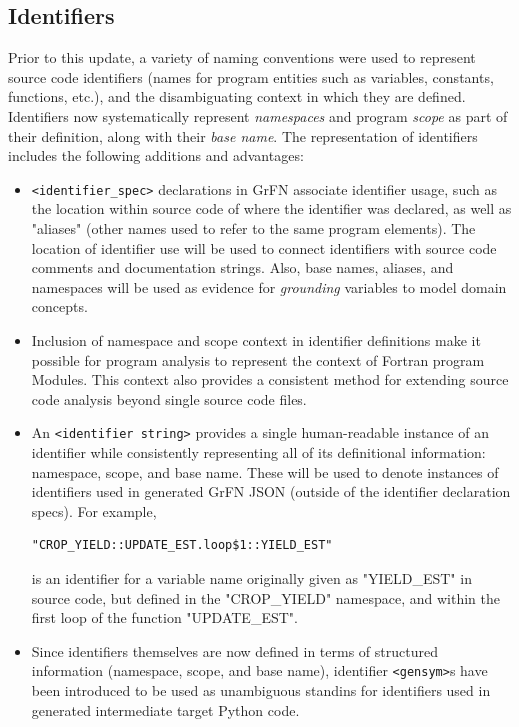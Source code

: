 \documentclass[article, 12pt, oneside]{memoir}
\begin{document}
\hypertarget{identifiers}{%
\subsection{Identifiers}\label{identifiers}}

Prior to this update, a variety of naming conventions were used to
represent source code identifiers (names for program entities such as
variables, constants, functions, etc.), and the disambiguating context
in which they are defined. Identifiers now systematically represent
\emph{namespaces} and program \emph{scope} as part of their definition,
along with their \emph{base name}. The representation of identifiers
includes the following additions and advantages:

\begin{itemize}
\item
  \texttt{\textless{}identifier\_spec\textgreater{}} declarations in
  GrFN associate identifier usage, such as the location within source
  code of where the identifier was declared, as well as "aliases" (other
  names used to refer to the same program elements). The location of
  identifier use will be used to connect identifiers with source code
  comments and documentation strings. Also, base names, aliases, and
  namespaces will be used as evidence for \emph{grounding} variables to
  model domain concepts.
\item
  Inclusion of namespace and scope context in identifier definitions
  make it possible for program analysis to represent the context of
  Fortran program Modules. This context also provides a consistent
  method for extending source code analysis beyond single source code
  files.
\item
  An \texttt{\textless{}identifier\ string\textgreater{}} provides a
  single human-readable instance of an identifier while consistently
  representing all of its definitional information: namespace, scope,
  and base name. These will be used to denote instances of identifiers
  used in generated GrFN JSON (outside of the identifier declaration
  specs). For example,

\begin{verbatim}
"CROP_YIELD::UPDATE_EST.loop$1::YIELD_EST"
\end{verbatim}

  is an identifier for a variable name originally given as "YIELD\_EST"
  in source code, but defined in the "CROP\_YIELD" namespace, and within
  the first loop of the function "UPDATE\_EST".
\item
  Since identifiers themselves are now defined in terms of structured
  information (namespace, scope, and base name), identifier
  \texttt{\textless{}gensym\textgreater{}}s have been introduced to be
  used as unambiguous standins for identifiers used in generated
  intermediate target Python code.
\end{itemize}
\end{document}
